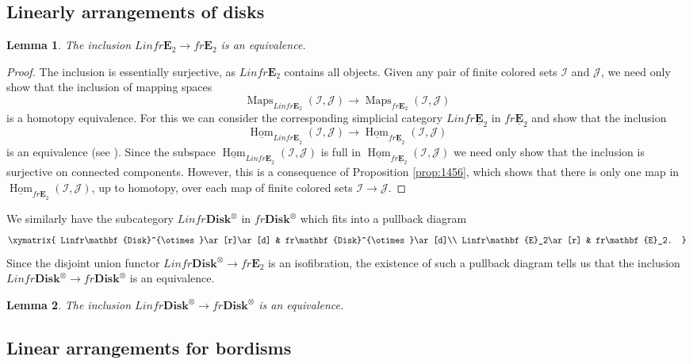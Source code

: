 \documentclass[reqno]{amsart}
\newtheorem{lemma}{Lemma}[section]
\theoremstyle{definition}
\newcommand{\mcl}[1]{\mathcal{#1}}
\newcommand{\ot}{\otimes}
\newcommand{\uHom}{\underline{\operatorname{Hom}}}
\newcommand{\E}{\mathbf{E}}
\newcommand{\uE}{\underline{\mathbf{E}}}
\newcommand{\Disk}{\mathbf{Disk}}
\DeclareMathOperator{\Maps}{Maps}
\renewcommand{\1}{\mathbf{1}}
\begin{document}
\subsection{Linearly arrangements of disks}

\begin{lemma}\label{lem:linfr_fr}
The inclusion $Linfr\E_2\to fr\E_2$ is an equivalence.
\end{lemma}

\begin{proof}
The inclusion is essentially surjective, as $Linfr\E_2$ contains all objects. Given any pair of finite colored sets $\mcl{I}$ and $\mcl{J}$, we need only show that the inclusion of mapping spaces
\[
\Maps_{Linfr\E_2}(\mcl{I},\mcl{J})\to \Maps_{fr\E_2}(\mcl{I},\mcl{J})
\]
is a homotopy equivalence.  For this we can consider the corresponding simplicial category $Linfr\uE_2$ in $fr\uE_2$ and show that the inclusion
\[
\uHom_{Linfr\uE_2}(\mcl{I},\mcl{J})\to \uHom_{fr\uE_2}(\mcl{I},\mcl{J})
\]
is an equivalence (see \cite[\href{https://kerodon.net/tag/02LN}{02LN}]{kerodon}).  Since the subspace $\uHom_{Linfr\uE_2}(\mcl{I},\mcl{J})$ is full in $\uHom_{fr\uE_2}(\mcl{I},\mcl{J})$ we need only show that the inclusion is surjective on connected components.  However, this is a consequence of Proposition \ref{prop:1456}, which shows that there is only one map in $\uHom_{fr\uE_2}(\mcl{I},\mcl{J})$, up to homotopy, over each map of finite colored sets $\mcl{I}\to \mcl{J}$.
\end{proof}

We similarly have the subcategory $Linfr\Disk^{\ot}$ in $fr\Disk^{\ot}$ which fits into a pullback diagram
\[
\xymatrix{
Linfr\Disk^{\ot}\ar[r]\ar[d] & fr\Disk^{\ot}\ar[d]\\
Linfr\E_2\ar[r] & fr\E_2.
}
\]
Since the disjoint union functor $Linfr\Disk^{\ot}\to fr\E_2$ is an isofibration, the existence of such a pullback diagram tells us that the inclusion $Linfr\Disk^{\ot}\to fr\Disk^{\ot}$ is an equivalence.

\begin{lemma}\label{lem:linfr_disk}
The inclusion $Linfr\Disk^{\ot}\to fr\Disk^{\ot}$ is an equivalence.
\end{lemma}

\subsection{Linear arrangements for bordisms}
\end{document}
